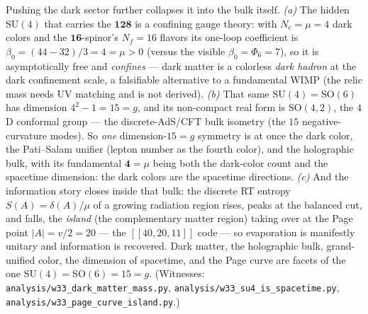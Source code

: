 \documentclass[11pt]{article}
\begin{document}
Pushing the dark sector further collapses it into the bulk itself. \emph{(a)} The
hidden $\mathrm{SU}(4)$ that carries the $\mathbf{128}$ is a confining gauge theory:
with $N_c=\mu=4$ dark colors and the $\mathbf{16}$-spinor's $N_f=16$ flavors its
one-loop coefficient is $\beta_0=(44-32)/3=4=\mu>0$ (versus the visible
$\beta_0=\Phi_6=7$), so it is asymptotically free and \emph{confines} --- dark
matter is a colorless \emph{dark hadron} at the dark confinement scale, a
falsifiable alternative to a fundamental WIMP (the relic mass needs UV matching and
is not derived). \emph{(b)} That same $\mathrm{SU}(4)=\mathrm{SO}(6)$ has dimension
$4^2-1=15=g$, and its non-compact real form is $\mathrm{SO}(4,2)$, the $4$D
conformal group --- the discrete-AdS/CFT bulk isometry (the $15$ negative-curvature
modes). So \emph{one} dimension-$15=g$ symmetry is at once the dark color, the
Pati--Salam unifier (lepton number as the fourth color), and the holographic bulk,
with its fundamental $\mathbf 4=\mu$ being both the dark-color count and the
spacetime dimension: the dark colors are the spacetime directions.
\emph{(c)} And the information story closes inside that bulk: the discrete RT
entropy $S(A)=\delta(A)/\mu$ of a growing radiation region rises, peaks at the
balanced cut, and falls, the \emph{island} (the complementary matter region)
taking over at the Page point $|A|=v/2=20$ --- the $[[40,20,11]]$ code --- so
evaporation is manifestly unitary and information is recovered. Dark matter, the
holographic bulk, grand-unified color, the dimension of spacetime, and the Page
curve are facets of the one $\mathrm{SU}(4)=\mathrm{SO}(6)=15=g$. (Witnesses:
\texttt{analysis/w33\_dark\_matter\_mass.py},
\texttt{analysis/w33\_su4\_is\_spacetime.py},
\texttt{analysis/w33\_page\_curve\_island.py}.)
\end{document}
